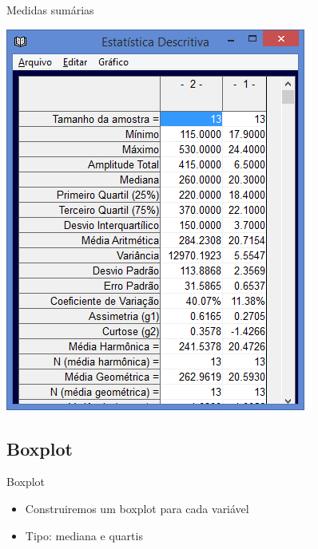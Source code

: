\documentclass{beamer}
\begin{document}
\begin{frame}{Medidas sumárias}
  \begin{center}
    \includegraphics[height=0.9\textheight]{Pratica_Desc/descritiva}
  \end{center}
\end{frame}

\subsection{Boxplot}

\begin{frame}{Boxplot}
  \begin{itemize}
  \item Construiremos um boxplot para cada variável
  \item Tipo: mediana e quartis
  \end{itemize}
\end{frame}
\end{document}
